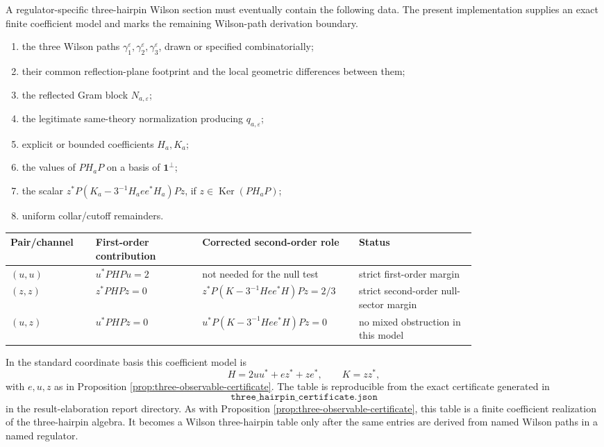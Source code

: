 \documentclass[11pt]{article}
\newcommand{\one}{\mathbf 1}
\newcommand{\eps}{\varepsilon}
\newcommand{\Ker}{\operatorname{Ker}}
\begin{document}
A regulator-specific three-hairpin Wilson section must eventually contain the following data.  The present implementation supplies an exact finite coefficient model and marks the remaining Wilson-path derivation boundary.
\begin{enumerate}[label=(T\arabic*)]
  \item the three Wilson paths \(\gamma_1^\eps,\gamma_2^\eps,\gamma_3^\eps\), drawn or specified combinatorially;
  \item their common reflection-plane footprint and the local geometric differences between them;
  \item the reflected Gram block \(N_{a,\eps}\);
  \item the legitimate same-theory normalization producing \(q_{a,\eps}\);
  \item explicit or bounded coefficients \(H_a,K_a\);
  \item the values of \(PH_aP\) on a basis of \(\one^\perp\);
  \item the scalar \(z^*P(K_a-3^{-1}H_aee^*H_a)Pz\), if \(z\in\Ker(PH_aP)\);
  \item uniform collar/cutoff remainders.
\end{enumerate}

\begin{center}
\begin{tabular}{p{0.16\linewidth}p{0.20\linewidth}p{0.20\linewidth}p{0.22\linewidth}}
\toprule
Pair/channel & First-order contribution & Corrected second-order role & Status \\
\midrule
\((u,u)\) & \(u^*PHPu=2\) & not needed for the null test & strict first-order margin \\
\((z,z)\) & \(z^*PHPz=0\) & \(z^*P(K-3^{-1}Hee^*H)Pz=2/3\) & strict second-order null-sector margin \\
\((u,z)\) & \(u^*PHPz=0\) & \(u^*P(K-3^{-1}Hee^*H)Pz=0\) & no mixed obstruction in this model \\
\bottomrule
\end{tabular}
\end{center}

In the standard coordinate basis this coefficient model is
\[
H=
2uu^*+ez^*+ze^*,
\qquad
K=zz^*,
\]
with \(e,u,z\) as in Proposition \ref{prop:three-observable-certificate}.  The table is reproducible from the exact certificate generated in
\[
\texttt{three\_hairpin\_certificate.json}
\]
in the result-elaboration report directory.
As with Proposition \ref{prop:three-observable-certificate}, this table is a finite coefficient realization of the three-hairpin algebra.  It becomes a Wilson three-hairpin table only after the same entries are derived from named Wilson paths in a named regulator.
\end{document}
